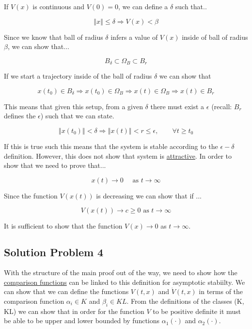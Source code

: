 \noindent If $V(x)$ is continuous and $V(0) = 0$, we can define a $\delta$ such that..

$$
\left\Vert x \right\Vert \leq \delta \Rightarrow V(x) < \beta
$$

\noindent Since we know that ball of radius $\delta$ infers a value of $V(x)$ inside of ball of radius $\beta$, we can show that...

$$
B_{\delta} \subset \Omega_B \subset B_r
$$

\noindent If we start a trajectory inside of the ball of radius $\delta$ we can show that

$$
x(t_0) \in B_{\delta} \Rightarrow x(t_0) \in \Omega_B \Rightarrow x(t) \in \Omega_B \Rightarrow x(t) \in B_r
$$

\noindent This means that given this setup, from a given $\delta$ there must exist a $\epsilon$ (recall: $B_r$ defines the $\epsilon$) such that we can state.

$$
\left\Vert x(t_0) \right\Vert < \delta \Rightarrow \left\Vert x(t) \right\Vert < r \leq \epsilon, \quad \quad \forall t \geq t_0
$$


\noindent If this is true such this means that the system is stable according to the $\epsilon-\delta$ definition. However, this does not show that system is \underline{attractive}. In order to show that we need to prove that...

$$
x(t) \rightarrow 0 \quad \text{ as } t \rightarrow \infty
$$


\noindent Since the function $V(x(t))$ is decreasing we can show that if ...

$$
V(x(t)) \rightarrow c \geq 0 \text{ as } t \rightarrow \infty
$$

\noindent It is sufficient to show that the function $V(x) \rightarrow 0 $ as $t \rightarrow \infty$.

\subsection*{Solution Problem 4}

With the structure of the main proof out of the way, we need to show how the \underline{comparison functions} can be linked to this definition for asymptotic stabiilty. We can show that we can define the functions $V(t,x)$ and $\dot{V}(t,x)$ in terms of the comparison function $\alpha_i \in K$ and $\beta_i \in KL$. From the definitions of the classes (K, KL) we can show that in order for the function $V$ to be positive definite it must be able to be upper and lower bounded by functions $\alpha_1(\cdot)$ and $\alpha_2(\cdot)$. \\

